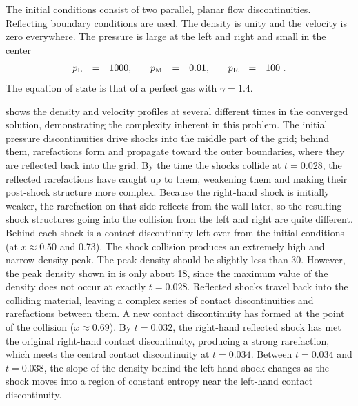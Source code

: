 The initial conditions consist of two parallel, planar flow discontinuities.
Reflecting boundary conditions are used. The density
is unity and the velocity is zero everywhere.
The pressure is large at the left and right and small in the center
\begin{equation}
\begin{array}{lclcclclcclcl}
p_{\rm L}    &=& 1000, &&    p_{\rm M} &=& 0.01, && p_{\rm R}    &=& 100\ .
\end{array}
\end{equation}
The equation of state is that of a perfect gas with $\gamma=1.4$.

 shows the density and velocity profiles at
several different times in the converged solution, demonstrating the
complexity inherent in this problem. The initial pressure
discontinuities drive shocks into the middle part of the grid;
behind them, rarefactions form and propagate toward the outer
boundaries, where they are reflected back into the grid. By the time
the shocks collide at $t=0.028$, the reflected rarefactions have
caught up to them, weakening them and making their post-shock
structure more complex. Because the right-hand shock is initially
weaker, the rarefaction on that side reflects from the wall later,
so the resulting shock structures going into the collision from the
left and right are quite different. Behind each shock is a contact
discontinuity left over from the initial conditions (at $x\approx
0.50$ and 0.73). The shock collision produces an extremely high and
narrow density peak. The peak density should be slightly less than
30.  However, the peak density shown in  is
only about 18, since the maximum value of the density does not occur
at exactly $t=0.028$. Reflected shocks travel back into the
colliding material, leaving a complex series of contact
discontinuities and rarefactions between them. A new contact
discontinuity has formed at the point of the collision ($x\approx
0.69$). By $t=0.032$, the right-hand reflected shock has met the
original right-hand contact discontinuity, producing a strong
rarefaction, which meets the central contact discontinuity at
$t=0.034$. Between $t=0.034$ and $t=0.038$, the slope of the density
behind the left-hand shock changes as the shock moves into a region
of constant entropy near the left-hand contact discontinuity.
